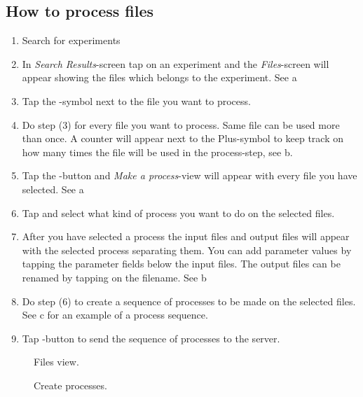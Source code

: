 \subsection{How to process files}


\begin{enumerate}
\item Search for experiments
\item In \emph{Search Results}-screen tap on an experiment and the \emph{Files}-screen will appear showing the files which belongs to the experiment. See a
\item Tap the -symbol next to the file you want to process.
\item Do step (3) for every file you want to process. Same file can be used more than once. A counter will appear next to the Plus-symbol to keep track on how many times the file will be used in the process-step, see b.
\item Tap the -button and \emph{Make a process}-view will appear with every file you have selected. See a
\item Tap  and select what kind of process you want to do on the selected files.
\item After you have selected a process the input files and output files will appear with the selected process separating them. You can add parameter values by tapping the parameter fields below the input files. The output files can be renamed by tapping on the filename. See b
\item Do step (6) to create a sequence of processes to be made on the selected files. See c for an example of a process sequence.

\item Tap -button to send the sequence of processes to the server.
\end{enumerate}


\begin{figure}[htb]
\caption{Files view.}
\label{fig:ios_files_view}
\end{figure}
\FloatBarrier

\begin{figure}[htb]
\caption{Create processes.}
\label{fig:ios_make_process_view}
\end{figure}
\FloatBarrier


